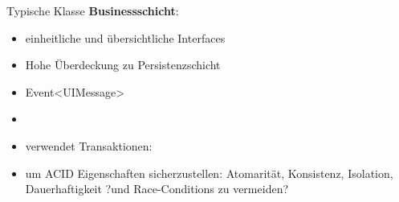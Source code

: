 \documentclass{beamer}
\begin{document}
\begin{frame}{Typische Klasse \textbf{Businessschicht}:}
\begin{itemize}
            \item einheitliche und übersichtliche Interfaces
            \item Hohe Überdeckung zu Persistenzschicht

            \item Event<UIMessage>

            \item %
            \item verwendet Transaktionen:
            \item um ACID Eigenschaften sicherzustellen: Atomarität, Konsistenz, Isolation, Dauerhaftigkeit
            ?und Race-Conditions zu vermeiden?
        \end{itemize}
    \end{frame}
\end{document}
